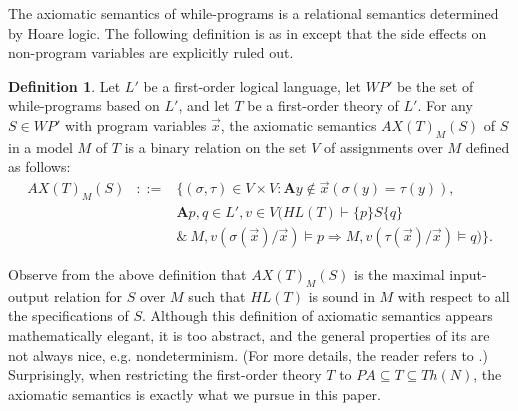 \documentclass[a4paper,11pt]{article}
\begin{document}
The axiomatic semantics of while-programs is a relational semantics determined by Hoare logic. The following definition is as in \cite[p303]{bergstra_2} except that the side effects on non-program variables are explicitly ruled out.

\theoremstyle{definition}
\newtheorem{definition_of_axiomatic_semantics}{Definition}[subsection]
\begin{definition_of_axiomatic_semantics}\label{definition_of_axiomatic_semantics}
  Let $L'$ be a first-order logical language, let $WP'$ be the set of while-programs based on $L'$, and let $T$ be a first-order theory of $L'$. For any $S\in WP'$ with program variables $\vec{x}$, the axiomatic semantics $AX(T)_M(S)$ of $S$ in a model $M$ of $T$ is a binary relation on the set $V$ of assignments over $M$ defined as follows:
  \begin{eqnarray*}
   AX(T)_M(S) &::=& \{ (\sigma, \tau)\in V\times V: \textbf{A} y\not\in \vec{x}( \sigma(y) = \tau(y) ), \\
              && \textbf{A} p,q\in L', v\in V ( HL(T)\vdash \{p\}S\{q\}\\
   && \& \  M,v(\sigma(\vec{x})/\vec{x}) \models p \Rightarrow M,v(\tau(\vec{x})/\vec{x}) \models q ) \}.
  \end{eqnarray*}
\end{definition_of_axiomatic_semantics}

Observe from the above definition that $AX(T)_M(S)$ is the maximal input-output relation for $S$ over $M$ such that $HL(T)$ is sound in $M$ with respect to all the specifications of $S$. Although this definition of axiomatic semantics appears mathematically elegant, it is too abstract, and the general properties of its are not always nice, e.g. nondeterminism. (For more details, the reader refers to \cite{bergstra_2}.) Surprisingly, when restricting the first-order theory $T$ to $PA \subseteq T \subseteq Th(N)$, the axiomatic semantics is exactly what we pursue in this paper.
\end{document}
